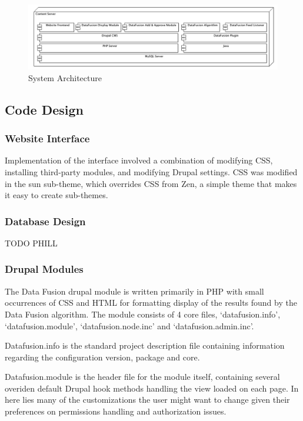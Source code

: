 \documentclass[11pt]{article} %
\begin{document}
\begin{figure}[htbp]
\begin{center}
\includegraphics[width=\columnwidth]{images/software_stack}
\caption{System Architecture}
\end{center}
\end{figure}

\subsection{Code Design}

\subsubsection{Website Interface}

Implementation of the interface involved a combination of modifying CSS, installing third-party modules, and modifying Drupal settings. CSS was modified in the sun sub-theme, which overrides CSS from Zen, a simple theme that makes it easy to create sub-themes.

\subsubsection{Database Design}

TODO PHILL

\subsubsection{Drupal Modules}

The Data Fusion drupal module is written primarily in PHP with small occurrences of CSS and HTML for formatting display of the results found by the Data Fusion algorithm. The module consists of 4 core files, ‘datafusion.info’,  ‘datafusion.module’, ‘datafusion.node.inc’ and ‘datafusion.admin.inc’.

Datafusion.info is the standard project description file containing information regarding the configuration version, package and core.

Datafusion.module is the header file for the module itself, containing several overiden default Drupal hook methods handling the view loaded on each page. In here lies many of the customizations the user might want to change given their preferences on permissions handling and authorization issues.
\end{document}
